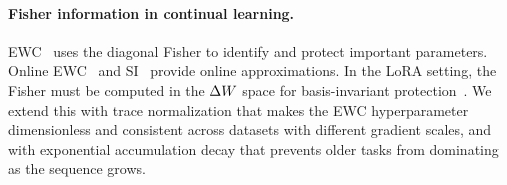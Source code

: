 \paragraph{Fisher information in continual learning.}
EWC~\citep{EWC2017} uses the diagonal Fisher to identify and protect important parameters.
Online EWC~\citep{schwarz2018progress} and SI~\citep{zenke2017continual} provide
online approximations.
In the LoRA setting, the Fisher must be computed in the $\Delta W$ space for
basis-invariant protection~\citep{zheng2025ewclora}.
We extend this with trace normalization that makes the EWC hyperparameter
dimensionless and consistent across datasets with different gradient scales,
and with exponential accumulation decay that prevents older tasks from dominating
as the sequence grows.

